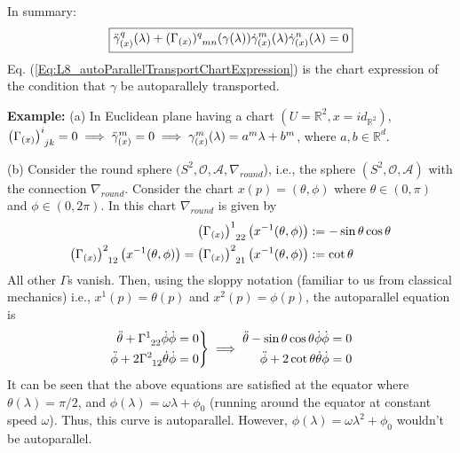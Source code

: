 In summary:
\begin{equation}\label{Eq:L8_autoParallelTransportChartExpression}
\boxed{\ddot{\gamma}^q_{(x)}(\lambda) + (\Gamma_{(x)})\indices{^{q}_{mn}}(\gamma(\lambda)) \dot{\gamma}^m_{(x)}(\lambda) \dot{\gamma}^n_{(x)}(\lambda) = 0}
\end{equation}
Eq. (\ref{Eq:L8_autoParallelTransportChartExpression}) is the chart expression of the condition that $\gamma$ be autoparallely transported.

\textbf{Example:} (a) In Euclidean plane having a chart $(U = \mathbb{R}^2, x = id_{\mathbb{R}^2})$, $\ccfx{i}{jk}{(x)} = 0 \\
\implies \ddot{\gamma}_{(x)}^m = 0 \implies \gamma_{(x)}^m (\lambda) = a^m \lambda + b^m$, where $a,b \in \mathbb{R}^d$.

(b) Consider the round sphere $(S^2, \mathcal{O}, \mathcal{A}, \nabla_{round}$), i.e., the sphere $(S^2, \mathcal{O}, \mathcal{A})$ with the connection $\nabla_{round}$. Consider the chart $x(p) = (\theta, \phi)$ where $\theta \in (0,\pi)$ and $\phi \in (0, 2\pi)$. In this chart $\nabla_{round}$ is given by
\begin{align*}
\ccfx{1}{22}{(x)}\left(x^{-1}(\theta,\phi)\right) & := - \sin\theta \cos\theta \\
\ccfx{2}{12}{(x)}\left(x^{-1}(\theta,\phi)\right) = \ccfx{2}{21}{(x)}\left(x^{-1}(\theta,\phi)\right) & := \cot\theta
\end{align*}
All other $\Gamma$s vanish. Then, using the sloppy notation (familiar to us from classical mechanics) i.e., $x^1(p) = \theta(p)$ and $x^2(p) = \phi(p)$, the autoparallel equation is
\begin{equation*}
 \left.\begin{aligned}
\ddot{\theta} + \ccf{1}{22} \dot{\phi}\dot{\phi} &= 0 \\
\ddot{\phi} + 2 \ccf{2}{12} \dot{\theta}\dot{\phi} &= 0
       \end{aligned}
 \right\} \implies
\begin{split}
\ddot{\theta} - \sin\theta \cos\theta \dot{\phi}\dot{\phi} &= 0 \\
\ddot{\phi} + 2 \cot\theta \dot{\theta}\dot{\phi} &= 0 \\
\end{split}
\end{equation*}
It can be seen that the above equations are satisfied at the equator where $\theta(\lambda) = \pi/2$, and $\phi(\lambda) = \omega\lambda + \phi_0$ (running around the equator at constant speed $\omega$). Thus, this curve is autoparallel. However, $\phi(\lambda) = \omega\lambda^2 + \phi_0$ wouldn't be autoparallel.

